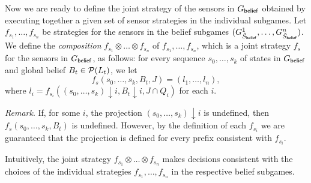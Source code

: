 Now we are ready to define the joint strategy of the sensors in $G_{\mathsf{belief}}$ obtained by executing together a given set of sensor strategies in the individual subgames. 
Let $f_{s_1},\ldots,f_{s_n}$ be strategies for the sensors in the belief subgames $(G^{1}_{\tilde{S}_{\mathsf{belief}}},\ldots,G^{n}_{\tilde{S}_{\mathsf{belief}}})$. We define the \emph{composition} $f_{s_1} \otimes\ldots\otimes f_{s_n}$ of $f_{s_1},\ldots,f_{s_n}$, which is a joint strategy $f_s$ for the sensors in $G_{\mathsf{belief}}$, as follows:
for every sequence $s_0,\ldots,s_k$ of states in $G_{\mathsf{belief}}$ and global belief $B_t \in \mathcal{P}(L_t)$, we let
\[f_s(s_0,\ldots,s_k,B_t,J) = (l_1,\ldots,l_n),\]
where $l_i = f_{s_i}((s_0,\ldots,s_k){\downarrow}i,B_t{\downarrow}i, J \cap Q_i)$ for each $i$. 

\emph{Remark}. If, for some $i$, the projection $(s_0,\ldots,s_k){\downarrow}i$ is undefined, then $f_s(s_0,\ldots,s_k,B_t)$ is undefined. However, by the definition of each $f_{s_i}$ we are guaranteed that the projection is defined for every prefix consistent with $f_{s_i}$.

Intuitively, the joint strategy $f_{s_1} \otimes\ldots\otimes f_{s_n}$ makes decisions consistent with the choices of the individual strategies $f_{s_1}, \ldots, f_{s_n}$ in the respective belief subgames.


